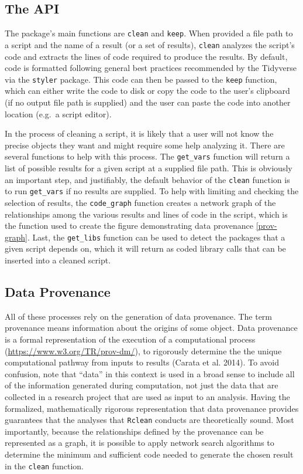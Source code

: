 \documentclass[]{article}
\begin{document}
\subsection{The API}\label{the-api}

The package's main functions are \texttt{clean} and \texttt{keep}. When
provided a file path to a script and the name of a result (or a set of
results), \texttt{clean} analyzes the script's code and extracts the
lines of code required to produce the results. By default, code is
formatted following general best practices recommended by the Tidyverse
via the \texttt{styler} package. This code can then be passed to the
\texttt{keep} function, which can either write the code to disk or copy
the code to the user's clipboard (if no output file path is supplied)
and the user can paste the code into another location (e.g.~a script
editor).

In the process of cleaning a script, it is likely that a user will not
know the precise objects they want and might require some help analyzing
it. There are several functions to help with this process. The
\texttt{get\_vars} function will return a list of possible results for a
given script at a supplied file path. This is obviously an important
step, and justifiably, the default behavior of the \texttt{clean}
function is to run \texttt{get\_vars} if no results are supplied. To
help with limiting and checking the selection of results, the
\texttt{code\_graph} function creates a network graph of the
relationships among the various results and lines of code in the script,
which is the function used to create the figure demonstrating data
provenance \ref{prov-graph}. Last, the \texttt{get\_libs} function can
be used to detect the packages that a given script depends on, which it
will return as coded library calls that can be inserted into a cleaned
script.

\subsection{Data Provenance}\label{data-provenance}

All of these processes rely on the generation of data provenance. The
term provenance means information about the origins of some object. Data
provenance is a formal representation of the execution of a
computational process (\url{https://www.w3.org/TR/prov-dm/}), to
rigorously determine the the unique computational pathway from inputs to
results (Carata et al. 2014). To avoid confusion, note that ``data'' in
this context is used in a broad sense to include all of the information
generated during computation, not just the data that are collected in a
research project that are used as input to an analysis. Having the
formalized, mathematically rigorous representation that data provenance
provides guarantees that the analyses that \texttt{Rclean} conducts are
theoretically sound. Most importantly, because the relationships defined
by the provenance can be represented as a graph, it is possible to apply
network search algorithms to determine the minimum and sufficient code
needed to generate the chosen result in the \texttt{clean} function.
\end{document}
